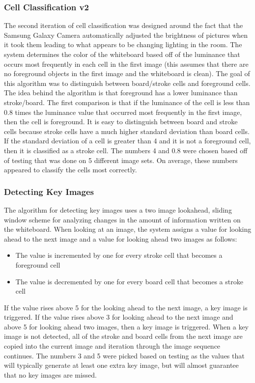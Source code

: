 \documentclass[]{article}
\begin{document}
			\subsubsection{Cell Classification v2}
				The second iteration of cell classification was designed around the fact that the Samsung Galaxy Camera automatically adjusted the brightness of pictures when it took them leading to what appears to be changing lighting in the room. The system determines the color of the whiteboard based off of the luminance that occurs most frequently in each cell in the first image (this assumes that there are no foreground objects in the first image and the whiteboard is clean). The goal of this algorithm was to distinguish between board/stroke cells and foreground cells. The idea behind the algorithm is that foreground has a lower luminance than stroke/board. The first comparison is that if the luminance of the cell is less than 0.8 times the luminance value that occurred most frequently in the first image, then the cell is foreground. It is easy to distinguish between board and stroke cells because stroke cells have a much higher standard deviation than board cells. If the standard deviation of a cell is greater than 4 and it is not a foreground cell, then it is classified as a stroke cell. The numbers 4 and 0.8 were chosen based off of testing that was done on 5 different image sets. On average, these numbers appeared to classify the cells most correctly. 
								
			\subsubsection{Detecting Key Images}
				The algorithm for detecting key images uses a two image lookahead, sliding window scheme for analyzing changes in the amount of information written on the whiteboard. When looking at an image, the system assigns a value for looking ahead to the next image and a value for looking ahead two images as follows:
				\begin{itemize}
					\item The value is incremented by one for every stroke cell that becomes a foreground cell
					\item The value is decremented by one for every board cell that becomes a stroke cell
				\end{itemize}
				If the value rises above 5 for the looking ahead to the next image, a key image is triggered. If the value rises above 3 for looking ahead to the next image and above 5 for looking ahead two images, then a key image is triggered. When a key image is not detected, all of the stroke and board cells from the next image are copied into the current image and iteration through the image sequence continues. The numbers 3 and 5 were picked based on testing as the values that will typically generate at least one extra key image, but will almost guarantee that no key images are missed. 
				
\end{document}
